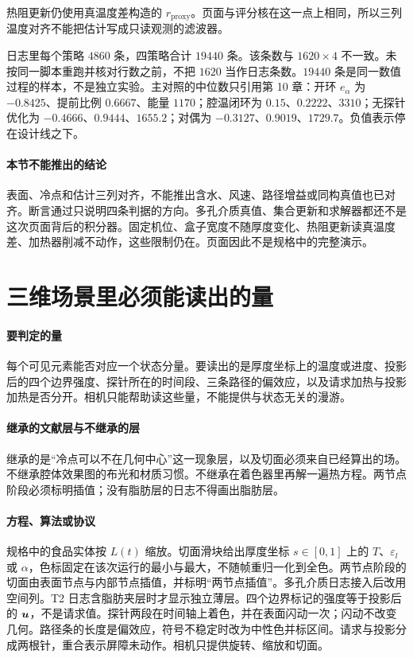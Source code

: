 热阻更新仍使用真温度差构造的 $r_{\mathrm{proxy}}$。页面与评分核在这一点上相同，所以三列温度对齐不能把估计写成只读观测的滤波器。

日志里每个策略 $4860$ 条，四策略合计 $19440$ 条。该条数与 $1620\times 4$ 不一致。未按同一脚本重跑并核对行数之前，不把 $1620$ 当作日志条数。$19440$ 条是同一数值过程的样本，不是独立实验。主对照的中位数只引用第 10 章：开环 $e_\alpha$ 为 $-0.8425$、提前比例 $0.6667$、能量 $1170$；腔温闭环为 $0.15$、$0.2222$、$3310$；无探针优化为 $-0.4666$、$0.9444$、$1655.2$；对偶为 $-0.3127$、$0.9019$、$1729.7$。负值表示停在设计线之下。

\paragraph{本节不能推出的结论}
表面、冷点和估计三列对齐，不能推出含水、风速、路径增益或同构真值也已对齐。断言通过只说明四条判据的方向。多孔介质真值、集合更新和求解器都还不是这次页面背后的积分器。固定机位、盒子宽度不随厚度变化、热阻更新读真温度差、加热器削减不动作，这些限制仍在。页面因此不是规格中的完整演示。

\section{三维场景里必须能读出的量}

\paragraph{要判定的量}
每个可见元素能否对应一个状态分量。要读出的是厚度坐标上的温度或进度、投影后的四个边界强度、探针所在的时间段、三条路径的偏效应，以及请求加热与投影加热是否分开。相机只能帮助读这些量，不能提供与状态无关的漫游。

\paragraph{继承的文献层与不继承的层}
继承的是“冷点可以不在几何中心”这一现象层，以及切面必须来自已经算出的场。不继承腔体效果图的布光和材质习惯。不继承在着色器里再解一遍热方程。两节点阶段必须标明插值；没有脂肪层的日志不得画出脂肪层。

\paragraph{方程、算法或协议}
规格中的食品实体按 $L(t)$ 缩放。切面滑块给出厚度坐标 $s\in[0,1]$ 上的 $T$、$\varepsilon_l$ 或 $\alpha$，色标固定在该次运行的最小与最大，不随帧重归一化到全色。两节点阶段的切面由表面节点与内部节点插值，并标明“两节点插值”。多孔介质日志接入后改用空间列。T2 日志含脂肪夹层时才显示独立薄层。四个边界标记的强度等于投影后的 $\bm{u}$，不是请求值。探针两段在时间轴上着色，并在表面闪动一次；闪动不改变几何。路径条的长度是偏效应，符号不稳定时改为中性色并标区间。请求与投影分成两根针，重合表示屏障未动作。相机只提供旋转、缩放和切面。


